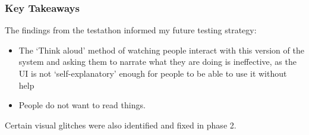 


\subsubsection{Key Takeaways} The findings from the testathon informed my future testing strategy:
\begin{itemize}
    \item The `Think aloud' method of watching people interact with this version of the system and asking them to narrate what they are doing is ineffective, as the UI is not `self-explanatory' enough for people to be able to use it without help 
    \item People do not want to read things. 
\end{itemize}

Certain visual glitches were also identified and fixed in phase 2. 

